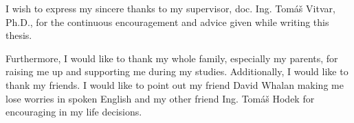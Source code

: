 I wish to express my sincere thanks to my supervisor, doc. Ing. Tomáš Vitvar, Ph.D., for the continuous encouragement and advice given while writing this thesis.

Furthermore, I would like to thank my whole family, especially my parents, for raising me up and supporting me during my studies. Additionally, I would like to thank my friends. I would like to point out my friend David Whalan making me lose worries in spoken English and my other friend Ing. Tomáš Hodek for encouraging in my life decisions.